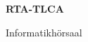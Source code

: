 \documentclass[a4paper]{article}
\begin{document}
\printGenericVSLHeader
\begin{center}
\begin{vsltext}{3cm}{4cm}

   \vspace{0.5cm} 

    \textbf{RTA-TLCA} 

    \vspace{1.5cm}

   Informatikhörsaal 

\end{vsltext}

\end{center}
\end{document}
